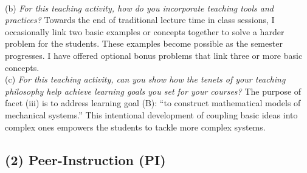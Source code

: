 \documentclass[../../../main.tex]{subfiles}
\begin{document}
\\
\vspace{0.15cm}
(b) \textit{For this teaching activity, how do you incorporate teaching tools and practices?} Towards the end of traditional lecture time in class sessions, I occasionally link two basic examples or concepts together to solve a harder problem for the students.  These examples become possible as the semester progresses.  I have offered optional bonus problems that link three or more basic concepts.
\\
\vspace{0.15cm}
(c) \textit{For this teaching activity, can you show how the tenets of your teaching philosophy help achieve learning goals you set for your courses?}  The purpose of facet (iii) is to address learning goal (B): ``to construct mathematical models of mechanical systems.''  This intentional development of coupling basic ideas into complex ones empowers the students to tackle more complex systems. 

\subsection{(2) Peer-Instruction (PI)}
\end{document}
